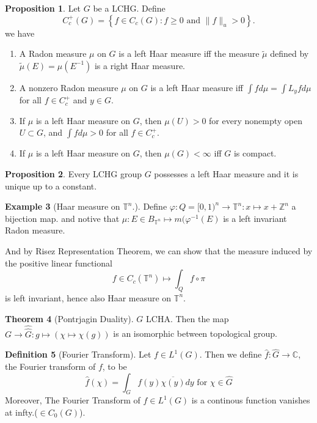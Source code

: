 \documentclass[12pt,a4paper]{book}
\newcommand{\bb}[1]{\mathbb{#1}}
\newenvironment{enu}{\begin{enumerate}[(1)]}{\end{enumerate}}
\theoremstyle{definition}
\newtheorem{defn}{Definition}[section]
\newtheorem{theo}[defn]{Theorem}
\newtheorem{prop}[defn]{Proposition}
\newtheorem{exam}[defn]{Example}
\begin{document}
\begin{prop}
    Let $G$ be a LCHG. Define
    $$
        C_c^{+}(G)=\left\{f \in C_c(G): f \geq 0 \text { and }\|f\|_u>0\right\} .
    $$
    we have
    \begin{enu}
        \item A Radon measure $\mu$ on $G$ is a left Haar measure iff the measure $\tilde{\mu}$ defined by $\widetilde{\mu}(E)=\mu\left(E^{-1}\right)$ is a right Haar measure.
        \item A nonzero Radon measure $\mu$ on $G$ is a left Haar measure iff $\int f d \mu=\int L_y f d \mu$ for all $f \in C_c^{+}$ and $y \in G$.
        \item If $\mu$ is a left Haar measure on $G$, then $\mu(U)>0$ for every nonempty open $U \subset G$, and $\int f d \mu>0$ for all $f \in C_c^{+}$.
        \item If $\mu$ is a left Haar measure on $G$, then $\mu(G)<\infty$ iff $G$ is compact.
    \end{enu}
\end{prop}
\begin{prop}
    Every LCHG group $G$ possesses a left Haar measure and it is unique up to a constant.
\end{prop}
\begin{exam}[Haar measure on $\bb{T}^n$.]
    Define $\varphi: Q=[0,1)^n\rightarrow \bb{T}^n: x\mapsto x+\bb{Z}^n$ a bijection map.
    and notive that $\mu: E\in B_{\bb{T}^n}\mapsto m(\varphi^{-1}(E)$ is a left invariant Radon measure.

    And by Risez Representation Theorem, we can show that the measure induced by the positive
    linear functional $$f\in C_c(\bb{T}^n)\mapsto \int_Q f\circ \pi$$ is left invariant, hence also Haar measure on $\mathbb{T}^n$.

\end{exam}
\begin{theo}[Pontrjagin Duality]
    $G$ LCHA. Then the map $G\rightarrow \hat{\hat{G}}:g\mapsto(\chi\mapsto \chi(g))$ is an isomorphic
    between topological group.
\end{theo}
\begin{defn}[Fourier Transform]
    Let $f \in L^1(G)$. Then we define $\hat{f}: \hat{G} \rightarrow \mathbb{C}$, the Fourier transform of $f$, to be
    $$
        \hat{f}(\chi)=\int_G f(y) \overline{\chi(y)} d y \text { for } \chi \in \hat{G}
    $$
    Moreover, The Fourier Transform of $f\in L^1(G)$ is a continous function vanishes at infty.($\in C_0(G)$).
\end{defn}
\end{document}
